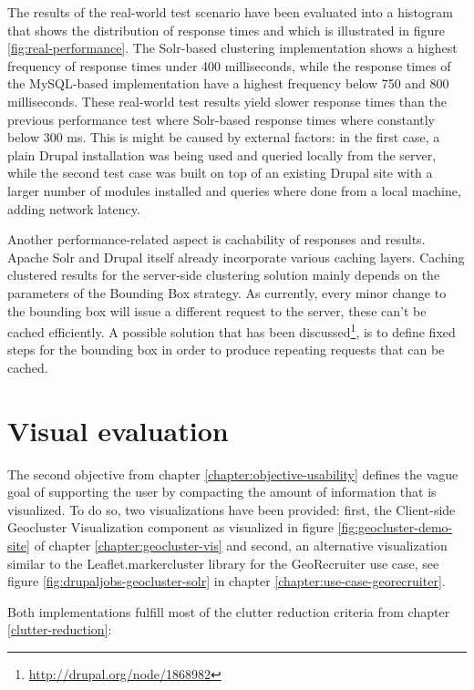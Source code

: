 The results of the real-world test scenario have been evaluated into a histogram that shows the distribution of response times and which is illustrated in figure \ref{fig:real-performance}. The Solr-based clustering implementation shows a highest frequency of response times under 400 milliseconds, while the response times of the MySQL-based implementation have a highest frequency below 750 and 800 milliseconds. These real-world test results yield slower response times than the previous performance test where Solr-based response times where constantly below 300 ms. This is might be caused by external factors: in the first case, a plain Drupal installation was being used and queried locally from the server, while the second test case was built on top of an existing Drupal site with a larger number of modules installed and queries where done from a local machine, adding network latency.

Another performance-related aspect is cachability of responses and results. Apache Solr and Drupal itself already incorporate various caching layers. Caching clustered results for the server-side clustering solution mainly depends on the parameters of the Bounding Box strategy. As currently, every minor change to the bounding box will issue a different request to the server, these can't be cached efficiently. A possible solution that has been discussed\footnote{\url{http://drupal.org/node/1868982}}, is to define fixed steps for the bounding box in order to produce repeating requests that can be cached. 



\section{Visual evaluation}

The second objective from chapter \ref{chapter:objective-usability} defines the vague goal of supporting the user by compacting the amount of information that is visualized. To do so, two visualizations have been provided: first, the Client-side Geocluster Visualization component as visualized in figure \ref{fig:geocluster-demo-site} of chapter \ref{chapter:geocluster-vis} and second, an alternative visualization similar to the Leaflet.markercluster library for the GeoRecruiter use case, see figure \ref{fig:drupaljobs-geocluster-solr} in chapter \ref{chapter:use-case-georecruiter}.

Both implementations fulfill most of the clutter reduction criteria from chapter \ref{clutter-reduction}:

